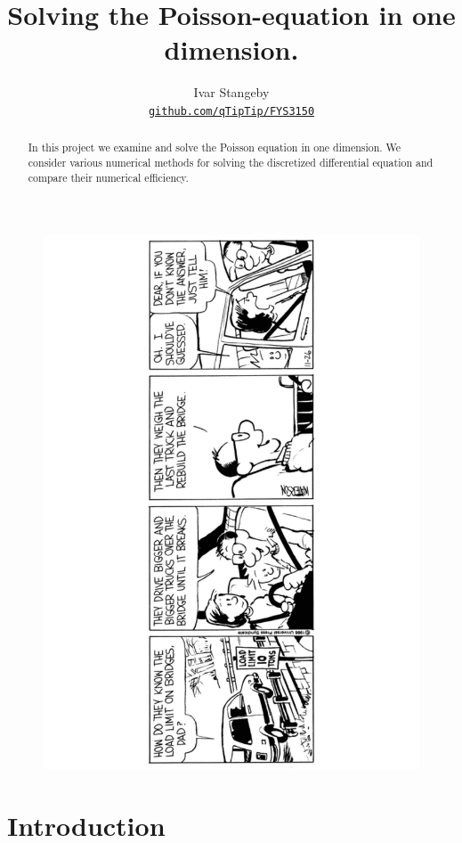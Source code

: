 \documentclass[10pt,a4paper]{amsart}
\title[Solving the Poisson-equation in one dimension]{
  Solving the Poisson-equation in one dimension. \\
  \hrulefill\fbox{FYS3150}\hrulefill
}
\author[Ivar Stangeby]{
  Ivar Stangeby \\
  \href{https://github.com/qTipTip/FYS3150/projects/project_1/}{\texttt{github.com/qTipTip/FYS3150} }
}
\begin{document}
  \begin{titlepage}
\begin{abstract}
  In this project we examine and solve the Poisson equation in one dimension.
  We consider various numerical methods for solving the discretized
  differential equation and compare their numerical efficiency.
\end{abstract}
  \maketitle
  
  \begin{figure}[h!]
    \centering
    \includegraphics[angle=270, width=0.9\linewidth]{c_h.pdf}
  \end{figure}
  \tableofcontents
  \end{titlepage}

  \section{Introduction}
  \label{sec:introduction}
\end{document}
